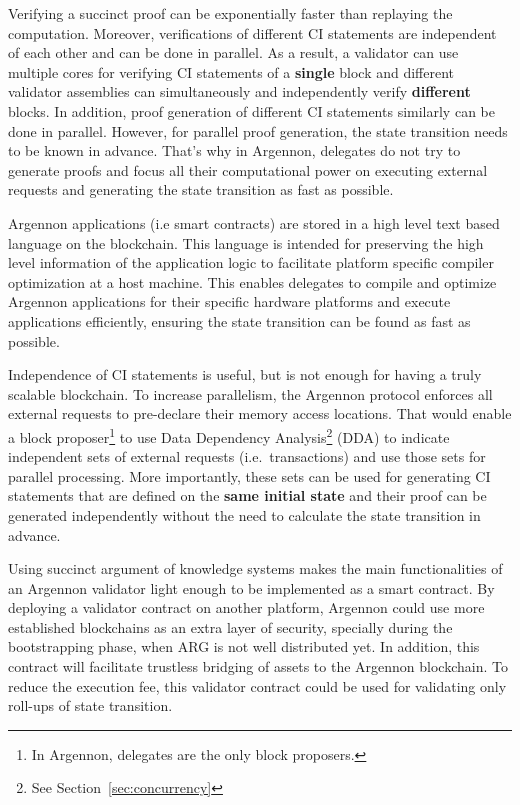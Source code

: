 Verifying a succinct proof can be exponentially faster than replaying the computation. Moreover, verifications of
different CI statements are independent of each other and can be done in parallel. As a result, a validator can use
multiple cores for verifying CI statements of a \textbf{single} block and different validator assemblies can
simultaneously and
independently verify \textbf{different} blocks.
In addition, proof generation of different CI statements similarly can be done in parallel. However, for parallel
proof generation, the state transition needs to be known in advance. That's why in Argennon, delegates do not try
to generate proofs and focus all their computational power on executing external requests and
generating the state transition as fast as possible.

Argennon applications (i.e smart contracts) are stored in a high level text based language on the blockchain. This
language is intended for preserving the
high level information of the application logic to facilitate platform specific compiler optimization at a host
machine. This enables delegates to compile and optimize Argennon applications for their specific hardware platforms
and execute applications efficiently, ensuring the state transition can be found as fast as possible.

Independence of CI statements is useful, but is not enough for having a truly scalable blockchain. To increase
parallelism, the Argennon protocol enforces all external requests to pre-declare their memory access locations. That
would enable a block proposer\footnote{In Argennon, delegates are the only block proposers.} to use Data Dependency
Analysis\footnote{See Section~\ref{sec:concurrency}} (DDA) to indicate independent sets of external requests (i.e.\
transactions) and use those sets for parallel processing. More importantly, these sets can be used for generating CI
statements that are defined on the \textbf{same initial state} and their proof can be generated independently without
the need to calculate the state transition in advance.

Using succinct argument of knowledge systems makes the main functionalities of an Argennon validator light enough to
be implemented as a smart contract. By deploying a validator contract on another platform, Argennon
could use more established blockchains as an extra layer of security, specially
during the bootstrapping phase, when ARG is not well distributed yet. In addition, this contract will facilitate
trustless bridging of assets to the Argennon blockchain. To reduce the execution fee, this validator
contract could be used for validating only roll-ups of state transition.

